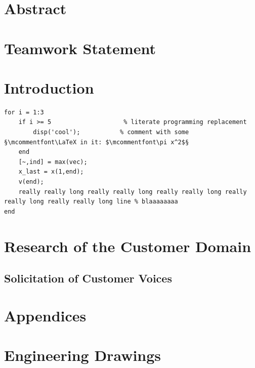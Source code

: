 \documentclass[12pt]{report}
\begin{document}
    \chapter*{Abstract}
        
        \clearpage
    
    
    \chapter*{Teamwork Statement}
        
        \clearpage
    
    
    \tableofcontents
    \clearpage
    \listoffigures
    \clearpage
    \listoftables
    \clearpage
    
    
    \chapter{Introduction}
        
\begin{lstlisting}
for i = 1:3
	if i >= 5                    % literate programming replacement
		disp('cool');           % comment with some §\mcommentfont\LaTeX in it: $\mcommentfont\pi x^2$§
	end
	[~,ind] = max(vec);
	x_last = x(1,end);
	v(end);
	really really long really really long really really long really really long really really long line % blaaaaaaaa
end
\end{lstlisting}
    
    \chapter{Research of the Customer Domain}
    
    
    \section{Solicitation of Customer Voices}
     

    \clearpage
    \printbibliography[heading=bibintoc, title={References}]
    \clearpage
    
    \appendix
    \chapter{Appendices}
    \label{sec:A-calculation_appendix}
    
    
    \chapter{Engineering Drawings}
    

    
    \clearpage
\end{document}
